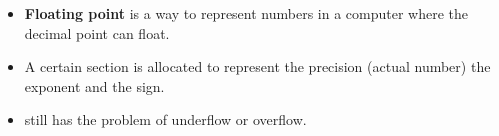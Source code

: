 \documentclass[11pt]{article}
\begin{document}
\begin{minipage}[l]{.5\linewidth}
    \begin{figure}[H]
        \centering
    \end{figure}    
\end{minipage}\hfill
\begin{minipage}[r]{.48\linewidth}
    \begin{itemize}
        \item \textbf{Floating point} is a way to represent numbers in a computer where the decimal point can float.
        \item A certain section is allocated to represent the precision (actual number) the exponent and the sign.
        \item still has the problem of underflow or overflow.
    \end{itemize}
\end{minipage}
\end{document}
